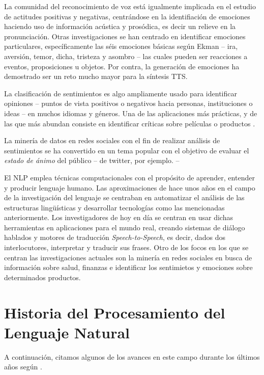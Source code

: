La comunidad del reconocimiento de voz está igualmente implicada en el estudio
de actitudes positivas y negativas, centrándose en la identifiación de emociones
haciendo uso de información acústica y prosódica, es decir un relieve en la
pronunciación. Otras investigaciones se han centrado en identificar emociones
particulares, específicamente las séis emociones básicas según Ekman -- ira,
aversión, temor, dicha, tristeza y asombro -- las cuales pueden ser reacciones a
eventos, proposiciones u objetos. Por contra, la generación de emociones ha
demostrado ser un reto mucho mayor para la síntesis \ac{TTS}.

La clasificación de sentimientos es algo ampliamente usado para identificar
opiniones -- puntos de vista positivos o negativos hacia personas, instituciones
o ideas -- en muchos idiomas y géneros. Una de las aplicaciones más prácticas, y
de las que más abundan consiste en identificar críticas sobre películas o
productos \cite{Pang:2002:TUS:1118693.1118704,Wang2014}.

La minería de datos en redes sociales con el fin de realizar análisis de
sentimientos se ha convertido en un tema popular con el objetivo de evaluar el
\emph{estado de ánimo} del público -- de twitter, por ejemplo. -- 

El \ac{NLP} emplea técnicas computacionales con el propósito de aprender,
entender y producir lenguaje humano. Las aproximaciones de hace unos años en el
campo de la investigación del lenguaje se centraban en automatizar el análisis
de las estructuras lingüísticas y desarrollar tecnologías como las mencionadas
anteriormente. Los investigadores de hoy en día se centran en usar dichas
herramientas en aplicaciones para el mundo real, creando sistemas de diálogo
hablados y motores de traducción \emph{Speech-to-Speech}, es decir, dados dos
interlocutores, interpretar y traducir sus frases. Otro de los focos en los que
se centran las investigaciones actuales son la minería en redes sociales en
busca de información sobre salud, finanzas e identificar los sentimietos y
emociones sobre determinados productos.

\section{Historia del Procesamiento del Lenguaje Natural}
\label{sec:currentnlp}

A continuación, citamos algunos de los avances en este campo durante los últimos
años según \citet{Hirschberg2015}.

